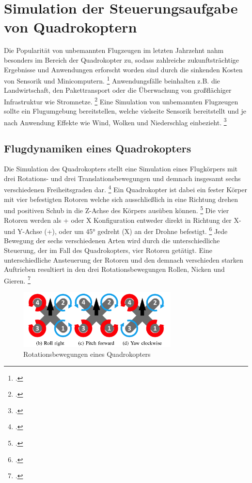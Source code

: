 \section{Simulation der Steuerungsaufgabe von Quadrokoptern}
Die Popularität von unbemannten Flugzeugen im letzten Jahrzehnt nahm besonders im Bereich der Quadrokopter zu, sodass zahlreiche zukunftsträchtige Ergebnisse und Anwendungen erforscht worden sind durch die sinkenden Kosten von Sensorik und Minicomputern. \footcite[Vgl.][S. 1]{Koch.2018}
Anwendungsfälle beinhalten z.B. die Landwirtschaft, den Pakettransport oder die Überwachung von großflächiger Infrastruktur wie Stromnetze. \footcite[Vgl.][S. 1]{Deshpande.2020}
Eine Simulation von unbemannten Flugzeugen sollte ein Flugumgebung bereitstellen, welche vielseite Sensorik bereitstellt und je nach Anwendung Effekte wie Wind, Wolken und Niederschlag einbezieht. \footcite[Vgl.][S. 1496]{Hentati.2018}

\subsection{Flugdynamiken eines Quadrokopters}
Die Simulation des Quadrokopters stellt eine Simulation eines Flugkörpers mit drei Rotations- und drei Translationsbewegungen und demnach insgesamt sechs verschiedenen Freiheitsgraden dar. \footcite[Vgl.][S. 2]{Koch.2018}
Ein Quadrokopter ist dabei ein fester Körper mit vier befestigten Rotoren welche sich ausschließlich in eine Richtung drehen und positiven Schub in die Z-Achse des Körpers ausüben können. \footcite[Vgl.][S. 3]{Molchanov.2019}
Die vier Rotoren werden als + oder X Konfiguration entweder direkt in Richtung der X- und Y-Achse (+), oder um 45° gedreht (X) an der Drohne befestigt. \footcite[Vgl.][S. 2]{Koch.2018}
Jede Bewegung der sechs verschiedenen Arten wird durch die unterschiedliche Steuerung, der im Fall des Quadrokopters, vier Rotoren getätigt.
Eine unterschiedliche Ansteuerung der Rotoren und den demnach verschieden starken Auftrieben resultiert in den drei Rotationsbewegungen Rollen, Nicken und Gieren. \footcite[Vgl.][S. 2]{Koch.2018}
\begin{figure}[htb]
    \centering
    \includegraphics[height=3cm]{lib/graphics/Drone axis.png}
    \caption[Rotationsbewegungen eines Quadrokopters]{Rotationsbewegungen eines Quadrokopters\footnotemark}
    \label{abb:drone axis}
\end{figure}

